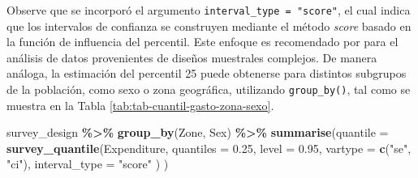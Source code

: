 \documentclass[
  spanish,
  12pt,
]{book}
\newenvironment{Shaded}{\begin{snugshade}}{\end{snugshade}}
\newcommand{\AttributeTok}[1]{\textcolor[rgb]{0.13,0.29,0.53}{#1}}
\newcommand{\FloatTok}[1]{\textcolor[rgb]{0.00,0.00,0.81}{#1}}
\newcommand{\FunctionTok}[1]{\textcolor[rgb]{0.13,0.29,0.53}{\textbf{#1}}}
\newcommand{\NormalTok}[1]{#1}
\newcommand{\SpecialCharTok}[1]{\textcolor[rgb]{0.81,0.36,0.00}{\textbf{#1}}}
\newcommand{\StringTok}[1]{\textcolor[rgb]{0.31,0.60,0.02}{#1}}
\begin{document}
Observe que se incorporó el argumento \texttt{interval\_type\ =\ "score"}, el cual indica que los intervalos de confianza se construyen mediante el método \emph{score} basado en la función de influencia del percentil. Este enfoque es recomendado por \citet{Lumley2010} para el análisis de datos provenientes de diseños muestrales complejos. De manera análoga, la estimación del percentil 25 puede obtenerse para distintos subgrupos de la población, como sexo o zona geográfica, utilizando \texttt{group\_by()}, tal como se muestra en la Tabla \ref{tab:tab-cuantil-gasto-zona-sexo}.

\begin{Shaded}
\begin{Highlighting}[]
\NormalTok{survey\_design }\SpecialCharTok{\%\textgreater{}\%}
  \FunctionTok{group\_by}\NormalTok{(Zone, Sex) }\SpecialCharTok{\%\textgreater{}\%}
  \FunctionTok{summarise}\NormalTok{(}\AttributeTok{quantile =} \FunctionTok{survey\_quantile}\NormalTok{(Expenditure,}
                                \AttributeTok{quantiles =} \FloatTok{0.25}\NormalTok{,}
                                \AttributeTok{level =} \FloatTok{0.95}\NormalTok{,}
                                \AttributeTok{vartype =} \FunctionTok{c}\NormalTok{(}\StringTok{"se"}\NormalTok{, }\StringTok{"ci"}\NormalTok{),}
                                \AttributeTok{interval\_type =} \StringTok{"score"}
\NormalTok{                                )}
\NormalTok{            )}
\end{Highlighting}
\end{Shaded}
\end{document}
